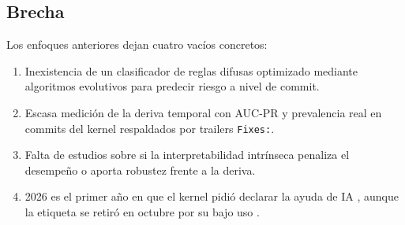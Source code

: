 \subsection{Brecha}
Los enfoques anteriores dejan cuatro vacíos concretos:
\begin{enumerate}
\item Inexistencia de un clasificador de reglas difusas optimizado mediante algoritmos evolutivos para predecir riesgo a nivel de commit.
\item Escasa medición de la deriva temporal con AUC-PR y prevalencia real en commits del kernel respaldados por trailers \texttt{Fixes:}.
\item Falta de estudios sobre si la interpretabilidad intrínseca penaliza el desempeño o aporta robustez frente a la deriva.
\item 2026 es el primer año en que el kernel pidió declarar la ayuda de IA \cite{KernelAdd}, aunque la etiqueta se retiró en octubre por su bajo uso \cite{KernelRemove}.
\end{enumerate}

